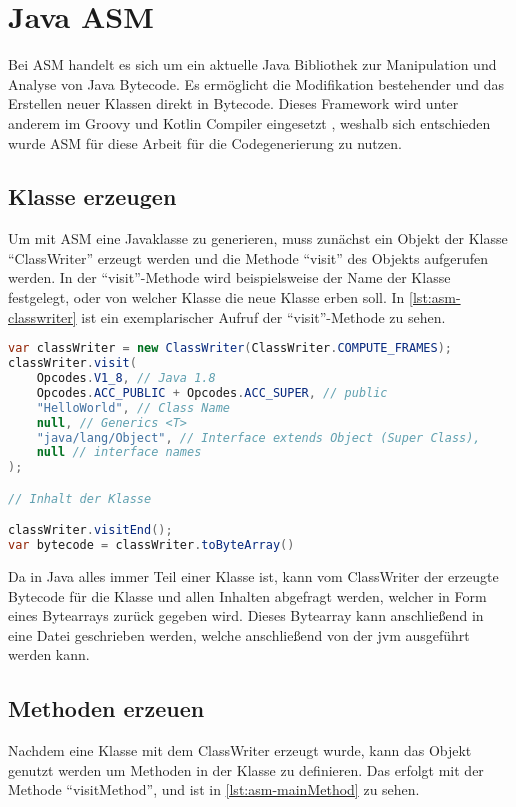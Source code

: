\section{Java ASM}
Bei ASM handelt es sich um ein aktuelle Java Bibliothek zur Manipulation und Analyse von Java Bytecode. Es ermöglicht die Modifikation bestehender und das Erstellen neuer Klassen direkt in Bytecode. Dieses Framework wird unter anderem im Groovy und Kotlin Compiler eingesetzt \cite{Bruneton2022}, weshalb sich entschieden wurde ASM für diese Arbeit für die Codegenerierung zu nutzen.

\subsection{Klasse erzeugen} \label{subsec:asm-classwriter}
Um mit ASM eine Javaklasse zu generieren, muss zunächst ein Objekt der Klasse \enquote{ClassWriter} erzeugt werden und die Methode \enquote{visit} des Objekts aufgerufen werden. In der \enquote{visit}-Methode wird beispielsweise der Name der Klasse festgelegt, oder von welcher Klasse die neue Klasse erben soll. In \cref{lst:asm-classwriter} ist ein exemplarischer Aufruf der \enquote{visit}-Methode zu sehen. 

\begin{lstlisting}[language=Java, caption=Erzeugung und Nutzung eines ClassWriters, label={lst:asm-classwriter}]
var classWriter = new ClassWriter(ClassWriter.COMPUTE_FRAMES);
classWriter.visit(
	Opcodes.V1_8, // Java 1.8
	Opcodes.ACC_PUBLIC + Opcodes.ACC_SUPER, // public
	"HelloWorld", // Class Name
	null, // Generics <T>
	"java/lang/Object", // Interface extends Object (Super Class),
	null // interface names
);

// Inhalt der Klasse

classWriter.visitEnd();
var bytecode = classWriter.toByteArray()

\end{lstlisting}

Da in Java alles immer Teil einer Klasse ist, kann vom ClassWriter der erzeugte Bytecode für die Klasse und allen Inhalten abgefragt werden, welcher in Form eines Bytearrays zurück gegeben wird. Dieses Bytearray kann anschließend in eine Datei geschrieben werden, welche anschließend von der \ac{jvm} ausgeführt werden kann.

\subsection{Methoden erzeuen}
Nachdem eine Klasse mit dem ClassWriter erzeugt wurde, kann das Objekt genutzt werden um Methoden in der Klasse zu definieren. Das erfolgt mit der Methode \enquote{visitMethod}, und ist in \cref{lst:asm-mainMethod} zu sehen.

